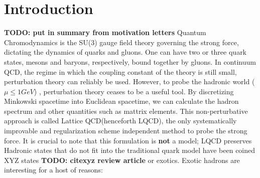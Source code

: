 
\chapter{Introduction}
\label{sec:intro}
\newcommand{\todo}[1]{\textbf{\color{red}TODO: #1}}

\todo{put in summary from motivation letters}
Quantum Chromodynamics is the SU(3) gauge field theory governing the strong force, dictating the dynamics of quarks and gluons. One can have two or three quark states, mesons and baryons, respectively, bound together by gluons. In continuum QCD, the regime in which the coupling constant of the theory is still small, perturbation theory can reliably be used. However, to probe the hadronic world ($\mu \leq 1 GeV$) , perturbation theory ceases to be a useful tool. By discretizing Minkowski spacetime into Euclidean spacetime, we can calculate the hadron spectrum and other quantities such as mattrix elements.
This non-perturbative approach is called Lattice QCD(henceforth LQCD), the only systematically improvable and regularization scheme independent method to probe the strong force. It is crucial to note that this formulation is \textbf{not} a model; LQCD preserves 
Hadronic states that do not fit into the traditional quark model have been coined XYZ states \todo{cite{xyz review article}} or exotics. Exotic hadrons are interesting for a host of reasons: 

